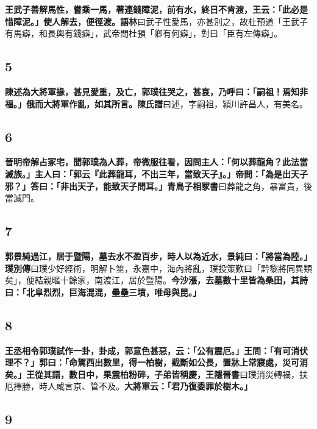 \textbf{王武子善解馬性，嘗乘一馬，著連錢障泥，前有水，終日不肯渡，王云：「此必是惜障泥。」使人解去，便徑渡。}{\footnotesize \textbf{語林}曰武子性愛馬，亦甚別之，故杜預道「王武子有馬癖，和長輿有錢癖」，武帝問杜預「卿有何癖」，對曰「臣有左傳癖」。}

\subsection*{5}

\textbf{陳述為大將軍掾，甚見愛重，及亡，郭璞往哭之，甚哀，乃呼曰：「嗣祖！焉知非福。」俄而大將軍作亂，如其所言。}{\footnotesize \textbf{陳氏譜}曰述，字嗣祖，潁川許昌人，有美名。}

\subsection*{6}

\textbf{晉明帝解占冢宅，聞郭璞為人葬，帝微服往看，因問主人：「何以葬龍角？此法當滅族。」主人曰：「郭云『此葬龍耳，不出三年，當致天子』。」帝問：「為是出天子邪？」答曰：「非出天子，能致天子問耳。」}{\footnotesize \textbf{青鳥子相冢書}曰葬龍之角，暴富貴，後當滅門。}

\subsection*{7}

\textbf{郭景純過江，居于暨陽，墓去水不盈百步，時人以為近水，景純曰：「將當為陸。」}{\footnotesize \textbf{璞別傳}曰璞少好經術，明解卜筮，永嘉中，海內將亂，璞投策歎曰「黔黎將同異類矣」，便結親暱十餘家，南渡江，居於暨陽。}\textbf{今沙漲，去墓數十里皆為桑田，其詩曰：「北阜烈烈，巨海混混，壘壘三墳，唯母與昆。」}

\subsection*{8}

\textbf{王丞相令郭璞試作一卦，卦成，郭意色甚惡，云：「公有震厄。」王問：「有可消伏理不？」郭曰：「命駕西出數里，得一柏樹，截斷如公長，置牀上常寢處，災可消矣。」王從其語，數日中，果震柏粉碎，子弟皆稱慶，}{\footnotesize \textbf{王隱晉書}曰璞消災轉禍，扶厄擇勝，時人咸言京、管不及。}\textbf{大將軍云：「君乃復委罪於樹木。」}

\subsection*{9}

